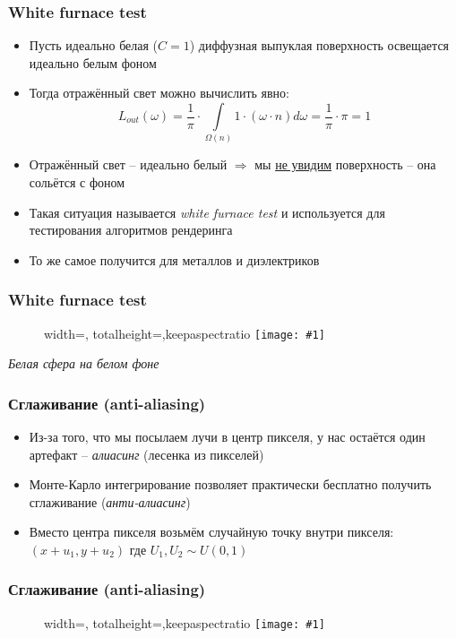 \documentclass[10pt]{beamer}
\newcommand{\slideimage}[1]{
  \begin{figure}
    \begin{adjustbox}{width=\textwidth, totalheight=\textheight-2\baselineskip-2\baselineskip,keepaspectratio}
      \texttt{[image: \#1]}
    \end{adjustbox}
  \end{figure}
}
\begin{document}
\begin{frame}[fragile]
\frametitle{White furnace test}
\begin{itemize}
\item Пусть идеально белая (\begin{math}C = 1\end{math}) диффузная выпуклая поверхность освещается идеально белым фоном
\pause
\item Тогда отражённый свет можно вычислить явно:
\begin{equation*}
L_{out}(\omega) = \frac{1}{\pi} \cdot \int\limits_{\Omega(n)} 1\cdot(\omega\cdot n) d\omega = \frac{1}{\pi} \cdot \pi = 1
\end{equation*}
\pause
\item Отражённый свет -- идеально белый \begin{math}\Longrightarrow\end{math} мы \underline{не увидим} поверхность -- она сольётся с фоном
\pause
\item Такая ситуация называется \textit{white furnace test} и используется для тестирования алгоритмов рендеринга
\pause
\item То же самое получится для металлов и диэлектриков
\end{itemize}
\end{frame}

\begin{frame}[fragile]
\frametitle{White furnace test}
\slideimage{white_furnace.png}
\begin{center}\textit{Белая сфера на белом фоне}\end{center}
\end{frame}

\begin{frame}[fragile]
\frametitle{Сглаживание (anti-aliasing)}
\begin{itemize}
\item Из-за того, что мы посылаем лучи в центр пикселя, у нас остаётся один артефакт -- \textit{алиасинг} (лесенка из пикселей)
\pause
\item Монте-Карло интегрирование позволяет практически бесплатно получить сглаживание (\textit{анти-алиасинг})
\pause
\item Вместо центра пикселя возьмём случайную точку внутри пикселя: \begin{math}(x+u_1,y+u_2)\end{math} где \begin{math}U_1, U_2 \sim U(0,1)\end{math}
\end{itemize}
\end{frame}

\begin{frame}[fragile]
\frametitle{Сглаживание (anti-aliasing)}
\slideimage{antialiasing.png}
\end{frame}
\end{document}
